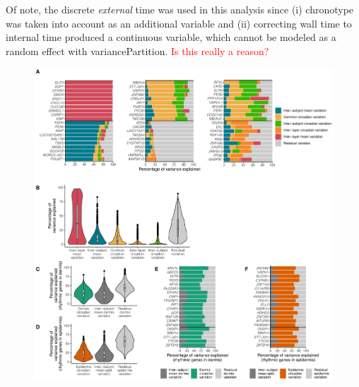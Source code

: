 {Of note, the discrete \textit{external} time was used in this analysis since (i) chronotype was taken into account as an additional variable and (ii) correcting wall time to internal time produced a continuous variable, which cannot be modeled as a random effect with variancePartition. \textcolor{red}{Is this really a reason?}\\
\begin{figure}[b!]
	\begin{center}
		\includegraphics[scale=0.55]{./Figures/fig2.pdf}

\end{center}
\end{figure}}
